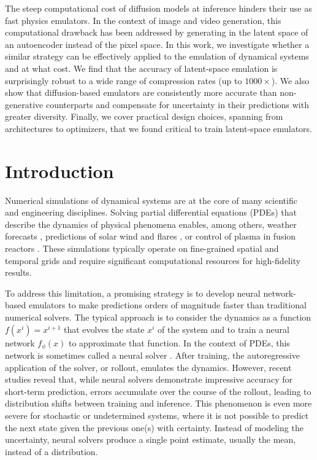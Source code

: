 The steep computational cost of diffusion models at inference hinders their use as fast physics emulators. In the context of image and video generation, this computational drawback has been addressed by generating in the latent space of an autoencoder instead of the pixel space. In this work, we investigate whether a similar strategy can be effectively applied to the emulation of dynamical systems and at what cost. We find that the accuracy of latent-space emulation is surprisingly robust to a wide range of compression rates (up to $1000\times$). We also show that diffusion-based emulators are consistently more accurate than non-generative counterparts and compensate for uncertainty in their predictions with greater diversity. Finally, we cover practical design choices, spanning from architectures to optimizers, that we found critical to train latent-space emulators.

\section{Introduction} \label{sec:lola-introduction}

Numerical simulations of dynamical systems are at the core of many scientific and engineering disciplines. Solving partial differential equations (PDEs) that describe the dynamics of physical phenomena enables, among others, weather forecasts \cite{ecmwf2024ifs, han2011revision}, predictions of solar wind and flares \cite{hundhausen1969numerical, mariska1989numerical, wang2013magnetohydrodynamics}, or control of plasma in fusion reactors \cite{dnestrovskii1986numerical, suzen2005numerical}. These simulations typically operate on fine-grained spatial and temporal grids and require significant computational resources for high-fidelity results.

To address this limitation, a promising strategy is to develop neural network-based emulators to make predictions orders of magnitude faster than traditional numerical solvers. The typical approach \cite{tompson2017accelerating, sanchez-gonzalez2020learning, pfaff2021learning, brandstetter2022message, stachenfeld2022learned, kovachki2023neural, lam2023learning, mccabe2024multiple, herde2024poseidon, morel2025disco} is to consider the dynamics as a function $f(x^i) = x^{i+1}$ that evolves the state $x^i$ of the system and to train a neural network $f_\phi(x)$ to approximate that function. In the context of PDEs, this network is sometimes called a neural solver \cite{brandstetter2022message, lippe2023pderefiner, kohl2024benchmarking}. After training, the autoregressive application of the solver, or rollout, emulates the dynamics.
However, recent studies \cite{brandstetter2022message, list2022learned, mccabe2023stability, lippe2023pderefiner, kohl2024benchmarking} reveal that, while neural solvers demonstrate impressive accuracy for short-term prediction, errors accumulate over the course of the rollout, leading to distribution shifts between training and inference. This phenomenon is even more severe for stochastic or undetermined systems, where it is not possible to predict the next state given the previous one(s) with certainty. Instead of modeling the uncertainty, neural solvers produce a single point estimate, usually the mean, instead of a distribution.

